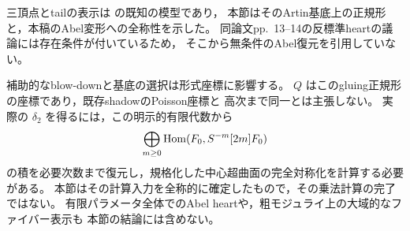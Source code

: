 \begin{remark}[既知の模型と未計算の係数変換]
\label{rem:ku-gluing-shadow-gap}
三頂点とtailの表示は \cite[\S2.3]{AKO2006} の既知の模型であり，
本節はそのArtin基底上の正規形と，本稿のAbel変形への全称性を示した。
同論文pp.~13--14の反標準heartの議論には存在条件が付いているため，
そこから無条件のAbel復元を引用していない。

補助的なblow-downと基底の選択は形式座標に影響する。
$Q$ はこのgluing正規形の座標であり，既存shadowのPoisson座標と
高次まで同一とは主張しない。
実際の $\delta_2$ を得るには，この明示的有限代数から
\[
 \bigoplus_{m\ge0}
 \operatorname{Hom}(F_0,S^{-m}[2m]F_0)
\]
の積を必要次数まで復元し，規格化した中心超曲面の完全対称化を計算する必要がある。
本節はその計算入力を全称的に確定したもので，その乗法計算の完了ではない。
有限パラメータ全体でのAbel heartや，粗モジュライ上の大域的なファイバー表示も
本節の結論には含めない。
\end{remark}
